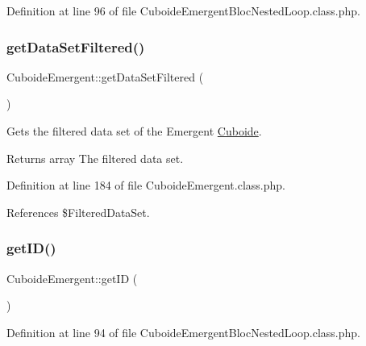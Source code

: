 Definition at line 96 of file Cuboide\+Emergent\+Bloc\+Nested\+Loop.\+class.\+php.

\mbox{\label{class_cuboide_emergent_aacc1b18d0fe89d98175eec66ddc15d8d}} 
\subsubsection{\texorpdfstring{get\+Data\+Set\+Filtered()}{getDataSetFiltered()}}
{\footnotesize\ttfamily Cuboide\+Emergent\+::get\+Data\+Set\+Filtered (\begin{DoxyParamCaption}{ }\end{DoxyParamCaption})}

Gets the filtered data set of the Emergent \hyperlink{class_cuboide}{Cuboide}.

\begin{DoxyReturn}{Returns}
array The filtered data set. 
\end{DoxyReturn}


Definition at line 184 of file Cuboide\+Emergent.\+class.\+php.



References \$\+Filtered\+Data\+Set.

\mbox{\label{class_cuboide_emergent_ab6bb8212e197a7a281f6078ef50fb3b9}} 
\subsubsection{\texorpdfstring{get\+I\+D()}{getID()}}
{\footnotesize\ttfamily Cuboide\+Emergent\+::get\+ID (\begin{DoxyParamCaption}{ }\end{DoxyParamCaption})}



Definition at line 94 of file Cuboide\+Emergent\+Bloc\+Nested\+Loop.\+class.\+php.

\mbox{\label{class_cuboide_emergent_aa67c2831cafde1f6fd35ca0de28c3d53}} 
